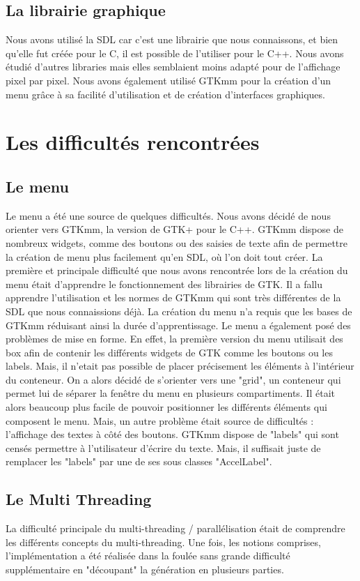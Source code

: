 \documentclass{article}
\begin{document}
	\subsection{La librairie graphique}
	Nous avons utilisé la SDL car c'est une librairie que nous connaissons, et bien qu'elle fut créée pour le C, il est possible de l'utiliser pour le C++.
	Nous avons étudié d'autres libraries mais elles semblaient moins adapté pour de l'affichage pixel par pixel.
	Nous avons également utilisé GTKmm pour la création d'un menu grâce à sa facilité d'utilisation et de création d'interfaces graphiques.

	\section{Les difficultés rencontrées}

	\subsection{Le menu}
	Le menu a été une source de quelques difficultés.
	Nous avons décidé de nous orienter vers GTKmm, la version de GTK+ pour le C++.
	GTKmm dispose de nombreux widgets, comme des boutons ou des saisies de texte afin de permettre la création de menu plus facilement qu'en SDL, où l'on doit tout créer.
	La première et principale difficulté que nous avons rencontrée lors de la création du menu était d'apprendre le fonctionnement des librairies de GTK. Il a fallu apprendre l'utilisation et les normes de GTKmm qui sont très différentes de la SDL que nous connaissions déjà.
	La création du menu n'a requis que les bases de GTKmm réduisant ainsi la durée d'apprentissage.
	Le menu a également posé des problèmes de mise en forme.
	En effet, la première version du menu utilisait des box afin de contenir les différents widgets de GTK comme les boutons ou les labels.
	Mais, il n'etait pas possible de placer précisement les éléments à l'intérieur du conteneur.
	On a alors décidé de s'orienter vers une "grid", un conteneur qui permet lui de séparer la fenêtre du menu en plusieurs compartiments.
	Il était alors beaucoup plus facile de pouvoir positionner les différents éléments qui composent le menu.
	Mais, un autre problème était source de difficultés : l'affichage des textes à côté des boutons.
	GTKmm dispose de "labels" qui sont censés permettre à l'utilisateur d'écrire du texte.
	Mais, il suffisait juste de remplacer les "labels" par une de ses sous classes "AccelLabel".

	\subsection{Le Multi Threading}
	La difficulté principale du multi-threading / parallélisation était de comprendre les différents concepts du multi-threading.
	Une fois, les notions comprises, l'implémentation a été réalisée dans la foulée sans grande difficulté supplémentaire en "découpant" la génération en plusieurs parties.
\end{document}
